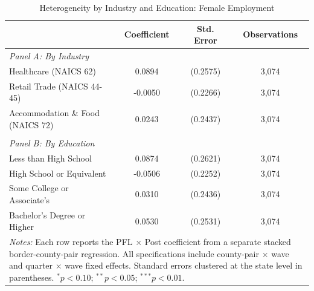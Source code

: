 \begin{table}[htbp]
\centering
\caption{Heterogeneity by Industry and Education: Female Employment}
\label{tab:heterogeneity}
\begin{tabular}{lccc}
\hline\hline
 & Coefficient & Std. Error & Observations \\
\hline
\multicolumn{4}{l}{\textit{Panel A: By Industry}} \\
Healthcare (NAICS 62) & 0.0894 & (0.2575) & 3,074 \\
Retail Trade (NAICS 44-45) & -0.0050 & (0.2266) & 3,074 \\
Accommodation \& Food (NAICS 72) & 0.0243 & (0.2437) & 3,074 \\
\\
\multicolumn{4}{l}{\textit{Panel B: By Education}} \\
Less than High School & 0.0874 & (0.2621) & 3,074 \\
High School or Equivalent & -0.0506 & (0.2252) & 3,074 \\
Some College or Associate's & 0.0310 & (0.2436) & 3,074 \\
Bachelor's Degree or Higher & 0.0530 & (0.2531) & 3,074 \\
\hline\hline
\multicolumn{4}{p{0.85\textwidth}}{\footnotesize \textit{Notes:} Each row reports the PFL $\times$ Post coefficient from a separate stacked border-county-pair regression. All specifications include county-pair $\times$ wave and quarter $\times$ wave fixed effects. Standard errors clustered at the state level in parentheses. $^{*}p<0.10$; $^{**}p<0.05$; $^{***}p<0.01$.} \\
\end{tabular}
\end{table}
